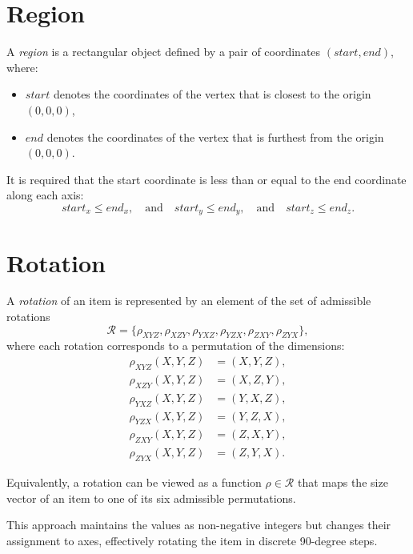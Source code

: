 \section{Region}

A \textit{region} is a rectangular object defined by a pair of coordinates $(\mathit{start}, \mathit{end})$, where:

\begin{itemize}
    \item $\mathit{start}$ denotes the coordinates of the vertex that is closest to the origin $(0, 0, 0)$,
    \item $\mathit{end}$ denotes the coordinates of the vertex that is furthest from the origin $(0, 0, 0)$.
\end{itemize}

It is required that the start coordinate is less than or equal to the end coordinate along each axis:
\[
\mathit{start}_x \leq \mathit{end}_x, \quad \text{and} \quad  
\mathit{start}_y \leq \mathit{end}_y, \quad \text{and} \quad 
\mathit{start}_z \leq \mathit{end}_z.
\]


\section{Rotation}



A \textit{rotation} of an item is represented by an element of the set of admissible rotations
\[
\mathcal{R} = \{ \rho_{XYZ}, \rho_{XZY}, \rho_{YXZ}, \rho_{YZX}, \rho_{ZXY}, \rho_{ZYX} \},
\]
where each rotation corresponds to a permutation of the dimensions:
\[
\begin{aligned}
\rho_{XYZ}(X, Y, Z) & = (X, Y, Z), \\
\rho_{XZY}(X, Y, Z) & = (X, Z, Y), \\
\rho_{YXZ}(X, Y, Z) & = (Y, X, Z), \\
\rho_{YZX}(X, Y, Z) & = (Y, Z, X), \\
\rho_{ZXY}(X, Y, Z) & = (Z, X, Y), \\
\rho_{ZYX}(X, Y, Z) & = (Z, Y, X).
\end{aligned}
\]

Equivalently, a rotation can be viewed as a function \(\rho \in \mathcal{R}\) that maps the size vector of an item to one of its six admissible permutations.

This approach maintains the values as non-negative integers but changes their assignment to axes, effectively rotating the item in discrete 90-degree steps.





